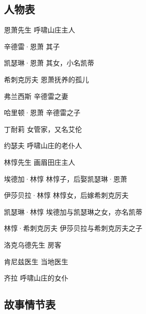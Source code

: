 \subsection{人物表}

\par 恩萧先生 呼啸山庄主人
\par 辛德雷·恩萧 其子
\par 凯瑟琳·恩萧 其女，小名凯蒂
\par 希刺克厉夫 恩萧抚养的孤儿
\par 弗兰西斯 辛德雷之妻
\par 哈里顿·恩萧 辛德雷之子
\par 丁耐莉 女管家，又名艾伦
\par 约瑟夫 呼啸山庄的老仆人
\par 林惇先生 画眉田庄主人
\par 埃德加·林惇 林惇子，后娶凯瑟琳·恩萧
\par 伊莎贝拉·林惇 林惇女，后嫁希刺克厉夫
\par 凯瑟琳·林惇 埃德加与凯瑟琳之女，亦名凯蒂
\par 林惇·希刺克厉夫 伊莎贝拉与希刺克厉夫之子
\par 洛克乌德先生 房客
\par 肯尼兹医生 当地医生
\par 齐拉 呼啸山庄的女仆


\subsection{故事情节表}

